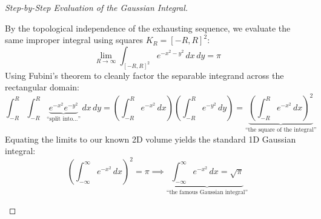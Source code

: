 \begin{proof}[Step-by-Step Evaluation of the Gaussian Integral]
\begin{math-stroke}
By the topological independence of the exhausting sequence, we evaluate the same improper integral using squares $K_R = [-R, R]^2$:
\[
\lim_{R \to \infty} \int_{[-R,R]^2} e^{-x^2-y^2} \, dx \, dy = \pi
\]
Using Fubini's theorem to cleanly factor the separable integrand across the rectangular domain:
\[
\int_{-R}^R \int_{-R}^R \underbrace{e^{-x^2} e^{-y^2}}_{\text{``split into...''}} \, dx \, dy = \left( \int_{-R}^R e^{-x^2} \, dx \right) \left( \int_{-R}^R e^{-y^2} \, dy \right) = \underbrace{\left( \int_{-R}^R e^{-x^2} \, dx \right)^2}_{\text{``the square of the integral''}}
\]
Equating the limits to our known 2D volume yields the standard 1D Gaussian integral:
\[
\left( \int_{-\infty}^\infty e^{-x^2} \, dx \right)^2 = \pi \implies \underbrace{\int_{-\infty}^\infty e^{-x^2} \, dx = \sqrt{\pi}}_{\text{``the famous Gaussian integral''}}
\]
\end{math-stroke}
\end{proof}
